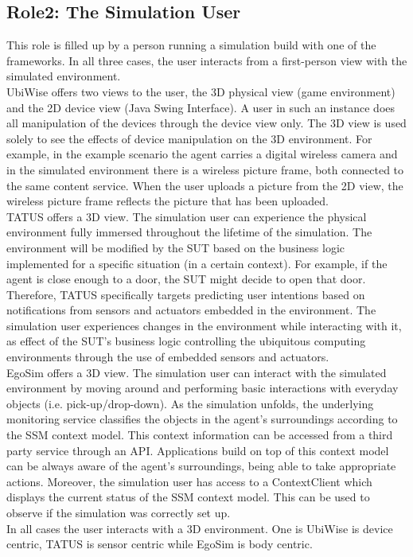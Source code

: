 \subsection{Role2: The Simulation User} %
\label{subsec:eval_role_simulation_user}
This role is filled up by a person running a simulation build with one of the frameworks. In all three cases, the user interacts from a first-person view with the simulated environment.\\

UbiWise offers two views to the user, the 3D physical view (game environment) and the 2D device view (Java Swing Interface). A user in such an instance does all manipulation of the devices through the device view only. The 3D view is used solely to see the effects of device manipulation on the 3D environment. For example, in the example scenario the agent carries a digital wireless camera and in the simulated environment there is a wireless picture frame, both connected to the same content service. When the user uploads a picture from the 2D view, the wireless picture frame reflects the picture that has been uploaded.\\

TATUS offers a 3D view. The simulation user can experience the physical environment fully immersed throughout the lifetime of the simulation. The environment will be modified by the SUT based on the business logic implemented for a specific situation (in a certain context). For example, if the agent is close enough to a door, the SUT might decide to open that door. Therefore, TATUS specifically targets predicting user intentions based on notifications from sensors and actuators embedded in the environment. The simulation user experiences changes in the environment while interacting with it, as effect of the SUT's business logic controlling the ubiquitous computing environments through the use of embedded sensors and actuators.\\

EgoSim offers a 3D view. The simulation user can interact with the simulated environment by moving around and performing basic interactions with everyday objects (i.e. pick-up/drop-down). As the simulation unfolds, the underlying monitoring service classifies the objects in the agent's surroundings according to the SSM context model. This context information can be accessed from a third party service through an API. Applications build on top of this context model can be always aware of the agent's surroundings, being able to take appropriate actions. Moreover, the simulation user has access to a ContextClient which displays the current status of the SSM context model. This can be used to observe if the simulation was correctly set up.\\

In all cases the user interacts with a 3D environment. One is UbiWise is device centric, TATUS is sensor centric while EgoSim is body centric.

